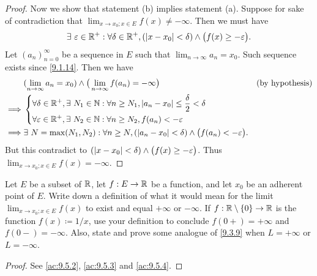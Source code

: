\begin{proof}
  Now we show that statement (b) implies statement (a).
  Suppose for sake of contradiction that \(\lim_{x \to x_0 ; x \in E} f(x) \neq -\infty\).
  Then we must have
  \[
    \exists\ \varepsilon \in \mathbb{R}^+ : \forall \delta \in \mathbb{R}^+, (\left\lvert x - x_0\right\rvert < \delta) \land \big(f(x) \geq -\varepsilon\big).
  \]
  Let \((a_n)_{n = 0}^\infty\) be a sequence in \(E\) such that \(\lim_{n \to \infty} a_n = x_0\).
  Such sequence exists since \cref{9.1.14}.
  Then we have
  \begin{align*}
             & (\lim_{n \to \infty} a_n = x_0) \land \big(\lim_{n \to \infty} f(a_n) = -\infty\big)                                  &  & \text{(by hypothesis)} \\
    \implies & \begin{dcases}
                 \forall \delta \in \mathbb{R}^+, \exists\ N_1 \in \mathbb{N} : \forall n \geq N_1, \left\lvert a_n - x_0\right\rvert \leq \dfrac{\delta}{2} < \delta \\
                 \forall \varepsilon \in \mathbb{R}^+, \exists\ N_2 \in \mathbb{N} : \forall n \geq N_2, f(a_n) < -\varepsilon
               \end{dcases}                                \\
    \implies & \exists\ N = \max(N_1, N_2) : \forall n \geq N, (\left\lvert a_n - x_0\right\rvert < \delta) \land \big(f(a_n) < -\varepsilon\big).
  \end{align*}
  But this contradict to \((\left\lvert x - x_0\right\rvert < \delta) \land \big(f(x) \geq -\varepsilon\big)\).
  Thus \(\lim_{x \to x_0 ; x \in E} f(x) = -\infty\).
\end{proof}

\exercisesection

\begin{ex}\label{ex:9.5.1}
  Let \(E\) be a subset of \(\mathbb{R}\), let \(f : E \to \mathbb{R}\) be a function, and let \(x_0\) be an adherent point of \(E\).
  Write down a definition of what it would mean for the limit \(\lim_{x \to x_0 ; x \in E} f(x)\) to exist and equal \(+\infty\) or \(-\infty\).
  If \(f : \mathbb{R} \setminus \{0\} \to \mathbb{R}\) is the function \(f(x) \coloneqq 1 / x\), use your definition to conclude \(f(0+) = +\infty\) and \(f(0-) = -\infty\).
  Also, state and prove some analogue of \cref{9.3.9} when \(L = +\infty\) or \(L = -\infty\).
\end{ex}

\begin{proof}
  See \cref{ac:9.5.2}, \cref{ac:9.5.3} and \cref{ac:9.5.4}.
\end{proof}